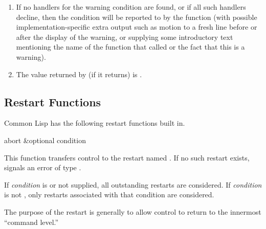 \begin{defun}[Function]
\begin{enumerate}
\item If no handlers for the warning condition are found, or if all such
     handlers decline, then the condition will be reported to 
     by the  function (with possible implementation-specific extra
     output such as motion to a fresh line before or after the display
     of the warning, or supplying some introductory text mentioning
     the name of the function that called  or the fact that this
     is a warning).

\item The value returned by  (if it returns) is .
\end{enumerate}
\end{defun}

%
%
%
%
%

\subsection{Restart Functions}

Common Lisp has the following restart functions built in.

\begin{defun}[Function]
abort &optional condition

  This function transfers control to the restart named . If no such
  restart exists,  signals an error of type .

 If {\it condition} is  or not supplied, all outstanding restarts
are considered.
If {\it condition} is not , only restarts associated
with that condition are considered.

  The purpose of the  restart is generally to allow control to return to the
  innermost ``command level.''
\end{defun}

